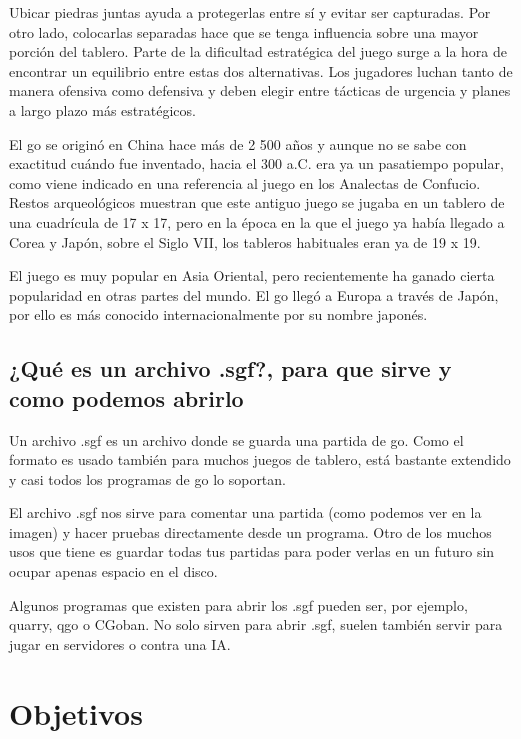 \documentclass[12pt,a4paper]{report}
\begin{document}
Ubicar piedras juntas ayuda a protegerlas entre sí y evitar ser capturadas. Por
otro lado, colocarlas separadas hace que se tenga influencia sobre una mayor
porción del tablero. Parte de la dificultad estratégica del juego surge a la
hora de encontrar un equilibrio entre estas dos alternativas. Los jugadores
luchan tanto de manera ofensiva como defensiva y deben elegir entre tácticas de
urgencia y planes a largo plazo más estratégicos.

El go se originó en China hace más de 2 500 años y aunque no se sabe con
exactitud cuándo fue inventado, hacia el 300 a.C. era ya un pasatiempo popular,
como viene indicado en una referencia al juego en los Analectas de Confucio.
Restos arqueológicos muestran que este antiguo juego se jugaba en un tablero de
una cuadrícula de 17 x 17, pero en la época en la que el juego ya había llegado
a Corea y Japón, sobre el Siglo VII, los tableros habituales eran ya de 19 x 19.

El juego es muy popular en Asia Oriental, pero recientemente ha ganado cierta
popularidad en otras partes del mundo. El go llegó a Europa a través de Japón,
por ello es más conocido internacionalmente por su nombre japonés.


\section{¿Qué es un archivo .sgf?, para que sirve y como podemos abrirlo}

\label{sgf} Un archivo .sgf es un archivo donde se guarda una partida de
go. Como el formato es usado también para muchos juegos de tablero, está
bastante extendido y casi todos los programas de go lo soportan.

El archivo .sgf nos sirve para comentar una partida (como podemos ver en la
imagen) y hacer pruebas directamente desde un programa. Otro de los muchos
usos que tiene es guardar todas tus partidas para poder verlas en un futuro sin
ocupar apenas espacio en el disco. %

Algunos programas que existen para abrir los .sgf pueden ser, por ejemplo,
quarry, qgo o CGoban. No solo sirven para abrir .sgf, suelen también servir para
jugar en servidores o contra una IA. %


\chapter{Objetivos} 
\end{document}
